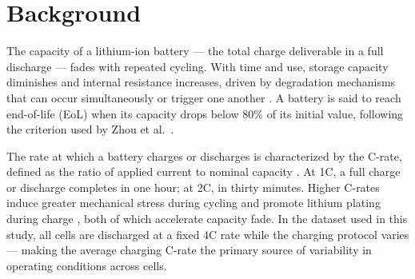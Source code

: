 \section{Background}

The capacity of a lithium-ion battery --- the total charge deliverable in a full discharge --- fades 
with repeated cycling. With time and use, storage capacity diminishes and internal resistance increases, driven by 
degradation mechanisms that can occur simultaneously or trigger one another \cite{edge2021}. A battery is said to 
reach end-of-life (EoL) when its capacity drops below 80\% of its initial value, following the criterion used by 
Zhou et al.\ \cite{ZHOU20236117}.

The rate at which a battery charges or discharges is characterized by the C-rate, defined as the ratio of applied 
current to nominal capacity \cite{ossila_crate}. At 1C, a full charge or discharge completes in one hour; at 2C, 
in thirty minutes. Higher C-rates induce greater mechanical stress during cycling and promote lithium plating during 
charge \cite{edge2021}, both of which accelerate capacity fade. In the dataset used in this study, all cells are 
discharged at a fixed 4C rate while the charging protocol varies --- making the average charging C-rate the primary 
source of variability in operating conditions across cells.